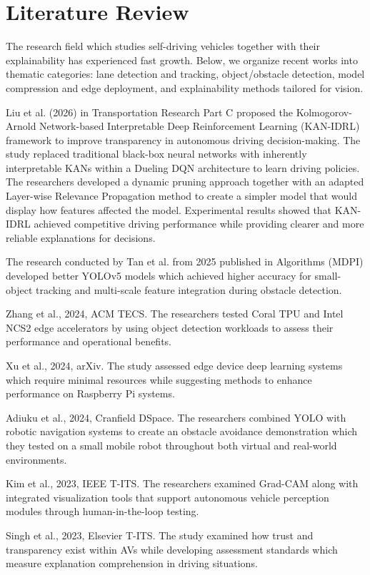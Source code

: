 \documentclass[conference]{IEEEtran}
\begin{document}
\section{Literature Review}
The research field which studies self-driving vehicles together with their explainability has experienced fast growth. Below, we organize recent works into thematic categories: lane detection and tracking, object/obstacle detection, model compression and edge deployment, and explainability methods tailored for vision.

Liu et al. (2026) in Transportation Research Part C proposed the Kolmogorov-Arnold Network-based Interpretable Deep Reinforcement Learning (KAN-IDRL) framework to improve transparency in autonomous driving decision-making. The study replaced traditional black-box neural networks with inherently interpretable KANs within a Dueling DQN architecture to learn driving policies. The researchers developed a dynamic pruning approach together with an adapted Layer-wise Relevance Propagation method to create a simpler model that would display how features affected the model. Experimental results showed that KAN-IDRL achieved competitive driving performance while providing clearer and more reliable explanations for decisions.

The research conducted by Tan et al. from 2025 published in Algorithms (MDPI) developed better YOLOv5 models which achieved higher accuracy for small-object tracking and multi-scale feature integration during obstacle detection.

Zhang et al., 2024, ACM TECS. The researchers tested Coral TPU and Intel NCS2 edge accelerators by using object detection workloads to assess their performance and operational benefits.

Xu et al., 2024, arXiv. The study assessed edge device deep learning systems which require minimal resources while suggesting methods to enhance performance on Raspberry Pi systems.

Adiuku et al., 2024, Cranfield DSpace. The researchers combined YOLO with robotic navigation systems to create an obstacle avoidance demonstration which they tested on a small mobile robot throughout both virtual and real-world environments.

Kim et al., 2023, IEEE T-ITS. The researchers examined Grad-CAM along with integrated visualization tools that support autonomous vehicle perception modules through human-in-the-loop testing.

Singh et al., 2023, Elsevier T-ITS. The study examined how trust and transparency exist within AVs while developing assessment standards which measure explanation comprehension in driving situations.
\end{document}
